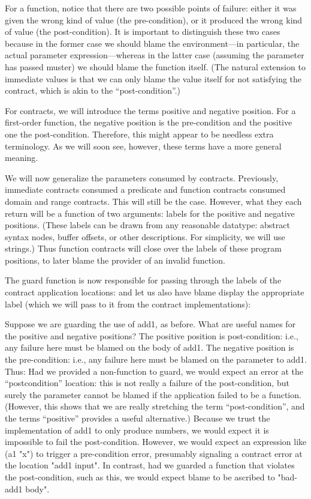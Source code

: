 For a function, notice that there are two possible points of failure: either it
was given the wrong kind of value (the pre-condition), or it produced the wrong
kind of value (the post-condition). It is important to distinguish these two
cases because in the former case we should blame the environment—in particular,
the actual parameter expression—whereas in the latter case (assuming the
parameter has passed muster) we should blame the function itself. (The natural
extension to immediate values is that we can only blame the value itself for not
satisfying the contract, which is akin to the “post-condition”.)

For contracts, we will introduce the terms positive and negative position. For a
first-order function, the negative position is the pre-condition and the
positive one the post-condition. Therefore, this might appear to be needless
extra terminology. As we will soon see, however, these terms have a more general
meaning.

We will now generalize the parameters consumed by contracts. Previously,
immediate contracts consumed a predicate and function contracts consumed domain
and range contracts. This will still be the case. However, what they each return
will be a function of two arguments: labels for the positive and negative
positions. (These labels can be drawn from any reasonable datatype: abstract
syntax nodes, buffer offsets, or other descriptions. For simplicity, we will use
strings.) Thus function contracts will close over the labels of these program
positions, to later blame the provider of an invalid function.

The guard function is now responsible for passing through the labels of the
contract application locations:
and let us also have blame display the appropriate label (which we will pass to
it from the contract implementations):

Suppose we are guarding the use of add1, as before. What are useful names for
the positive and negative positions? The positive position is post-condition:
i.e., any failure here must be blamed on the body of add1. The negative position
is the pre-condition: i.e., any failure here must be blamed on the parameter to
add1. Thus:
Had we provided a non-function to guard, we would expect an error at the
“postcondition” location: this is not really a failure of the post-condition,
but surely the parameter cannot be blamed if the application failed to be a
function. (However, this shows that we are really stretching the term
“post-condition”, and the terms “positive” provides a useful alternative.)
Because we trust the implementation of add1 to only produce numbers, we would
expect it is impossible to fail the post-condition. However, we would expect an
expression like (a1 "x") to trigger a pre-condition error, presumably signaling
a contract error at the location "add1 input". In contrast, had we guarded a
function that violates the post-condition, such as this,
we would expect blame to be ascribed to "bad-add1 body".

